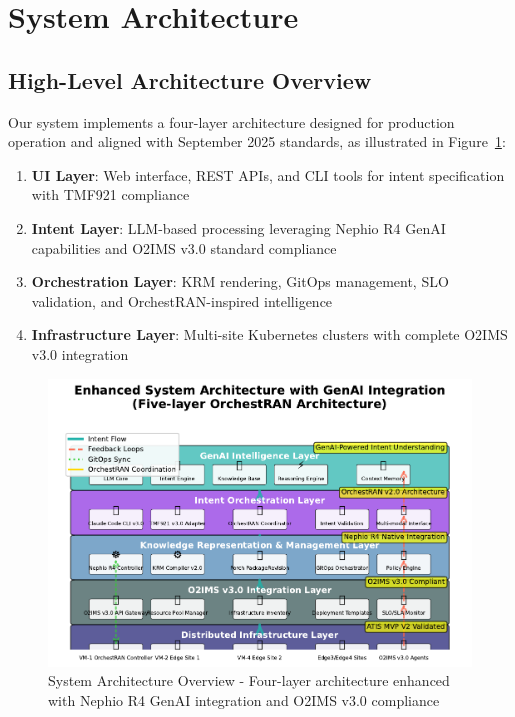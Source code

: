 \section{System Architecture}
\label{sec:methodology}

\subsection{High-Level Architecture Overview}

Our system implements a four-layer architecture designed for production operation and aligned with September 2025 standards, as illustrated in Figure~\ref{fig:architecture}:

\begin{enumerate}
\item \textbf{UI Layer}: Web interface, REST APIs, and CLI tools for intent specification with TMF921 compliance
\item \textbf{Intent Layer}: LLM-based processing leveraging Nephio R4 GenAI capabilities and O2IMS v3.0 standard compliance
\item \textbf{Orchestration Layer}: KRM rendering, GitOps management, SLO validation, and OrchestRAN-inspired intelligence
\item \textbf{Infrastructure Layer}: Multi-site Kubernetes clusters with complete O2IMS v3.0 integration
\end{enumerate}

\begin{figure}[htbp]
\centering
\includegraphics[width=\columnwidth]{figures/figure1_genai_architecture.pdf}
\caption{System Architecture Overview - Four-layer architecture enhanced with Nephio R4 GenAI integration and O2IMS v3.0 compliance}
\label{fig:architecture}
\end{figure}

